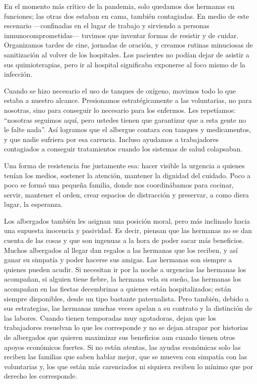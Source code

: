 \documentclass[
  spanish,
  11pt,
  a4paper,
]{scrbook}
\begin{document}
En el momento más crítico de la pandemia, solo quedamos dos hermanas en
funciones; las otras dos estaban en cama, también contagiadas. En medio
de este escenario ---confinadas en el lugar de trabajo y sirviendo a
personas inmunocomprometidas--- tuvimos que inventar formas de resistir
y de cuidar. Organizamos tardes de cine, jornadas de oración, y creamos
rutinas minuciosas de sanitización al volver de los hospitales. Los
pacientes no podían dejar de asistir a sus quimioterapias, pero ir al
hospital significaba exponerse al foco mismo de la infección.

Cuando se hizo necesario el uso de tanques de oxígeno, movimos todo lo
que estaba a nuestro alcance. Presionamos estratégicamente a las
voluntarias, no para nosotras, sino para conseguir lo necesario para los
enfermos. Les repetíamos: ``nosotras seguimos aquí, pero ustedes tienen
que garantizar que a esta gente no le falte nada''. Así logramos que el
albergue contara con tanques y medicamentos, y que nadie sufriera por
esa carencia. Incluso ayudamos a trabajadores contagiados a conseguir
tratamientos cuando los sistemas de salud colapsaban.

Una forma de resistencia fue justamente esa: hacer visible la urgencia a
quienes tenían los medios, sostener la atención, mantener la dignidad
del cuidado. Poco a poco se formó una pequeña familia, donde nos
coordinábamos para cocinar, servir, mantener el orden, crear espacios de
distracción y preservar, a como diera lugar, la esperanza.

Los albergados también les asignan una posición moral, pero más
inclinado hacia una supuesta inocencia y pasividad. Es decir, piensan
que las hermanas no se dan cuenta de las cosas y que son ingenuas a la
hora de poder sacar más beneficios. Muchos albergados al llegar dan
regalos a las hermanas que los reciben, y así ganar su simpatía y poder
hacerse sus amigas. Las hermanas son siempre a quienes pueden acudir. Si
necesitan ir por la noche a urgencias las hermanas los acompañan, si
alguien tiene fiebre, la hermana vela su sueño, las hermanas los
acompañan en las fiestas decembrinas a quienes están hospitalizados;
están siempre disponibles, desde un tipo bastante paternalista. Pero
también, debido a sus estrategias, las hermanas muchas veces apelan a su
contrato y la distinción de las labores. Cuando tienen temporadas muy
agotadoras, dejan que los trabajadores resuelvan lo que les corresponde
y no se dejan atrapar por historias de albergados que quieren maximizar
sus beneficios aun cuando tienen otros apoyos económicos fuertes. Si no
están atentas, las ayudas económicas solo las reciben las familias que
saben hablar mejor, que se mueven con simpatía con las voluntarias y,
los que están más carenciados ni siquiera reciben lo mínimo que por
derecho les corresponde.
\end{document}
